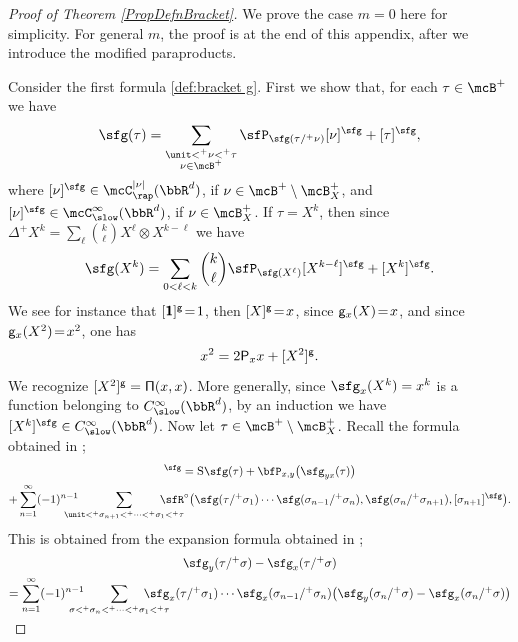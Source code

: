 \begin{proof}[Proof of Theorem \ref{PropDefnBracket}]
We prove the case $m=0$ here for simplicity. For general $m$, the proof is at the end of this appendix, after we introduce the modified paraproducts.

Consider the first formula \eqref{def:bracket g}. First we show that, for each $\tau\in\mcB^+$ we have
\begin{align}\label{predef:bracket g}
\sfg(\tau)=\sum_{\substack{\unit<^+\nu<^+\tau\\ \nu\in\mcB^+}}\sfP_{\sfg(\tau/^+\nu)}[\nu]^\sfg+[\tau]^\sfg,
\end{align}
where $[\nu]^\sfg\in \mcC_\rap^{|\nu|}(\bbR^d)$, if $\nu\in\mcB^+\setminus\mcB_X^+$, and $[\nu]^\sfg\in \mcC_\slow^\infty(\bbR^d)$, if $\nu\in\mcB_X^+$. If $\tau=X^k$, then since $\Delta^+X^k=\sum_{\ell}\binom{k}{\ell}X^\ell\otimes X^{k-\ell}$ we have
\[
\sfg(X^k)=\sum_{0<\ell<k}\binom{k}{\ell}\sfP_{\sfg(X^\ell)}[X^{k-\ell}]^\sfg+[X^k]^\sfg.
\]
We see for instance that $[\boldsymbol{\mathsf{1}}]^{\sf g}\!=\!1$, then $[X]^{\sf g}\!=\!x$, since ${\sf g}_x(X)\!=\!x$, and since ${\sf g}_x(X^2)\!=\!x^2$, one has
\[
x^2 = 2{\sf P}_xx + [X^2]^{\sf g}.
\]
We recognize $[X^2]^{\sf g}={\sf \Pi}(x,x)$. More generally, since $\sfg_x(X^k)=x^k$ is a function belonging to $C_\slow^\infty(\bbR^d)$, by an induction we have $[X^k]^\sfg\in C_\slow^\infty(\bbR^d)$. Now let $\tau\in\mcB^+\setminus\mcB_X^+$. Recall the formula obtained in \cite{BH};
\begin{multline*}
[\tau]^\sfg = \textsc{S}\sfg(\tau)+\bfP_{x,y}\bigl(\sfg_{yx}(\tau)\bigr) \\
+ \sum_{n=1}^\infty(-1)^{n-1}\hspace*{-5mm}\sum_{\unit<^+\sigma_{n+1}<^+\cdots<^+\sigma_1<^+\tau}\hspace*{-8mm} {\sfR}^\circ\bigl(\sfg(\tau/^+\sigma_1)\cdots\sfg(\sigma_{n-1}/^+\sigma_n),\sfg(\sigma_n/^+\sigma_{n+1}),[\sigma_{n+1}]^\sfg\bigr).
\end{multline*}
This is obtained from the expansion formula obtained in \cite{BH};
\begin{multline}\label{expansion of g(tau/sigma)}
\sfg_y(\tau/^+\sigma)-\sfg_x(\tau/^+\sigma)\\
=\sum_{n=1}^\infty(-1)^{n-1}\hspace*{-5mm}\sum_{\sigma<^+\sigma_n<^+\cdots<^+\sigma_1<^+\tau}\hspace*{-8mm}
\sfg_x(\tau/^+\sigma_1)\cdots\sfg_x(\sigma_{n-1}/^+\sigma_n)\bigl(\sfg_y(\sigma_n/^+\sigma)-\sfg_x(\sigma_n/^+\sigma)\bigr)\\[-5pt]

\end{multline}
\end{proof}
